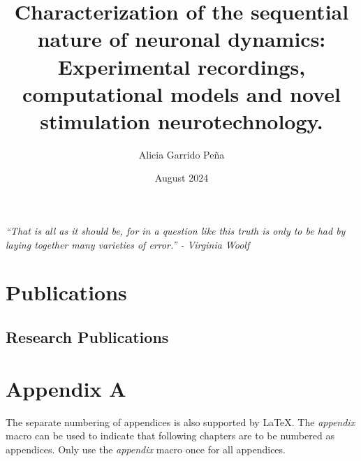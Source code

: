 \documentclass[11pt,a4paper,twoside]{book} %
\title{Characterization of the sequential nature of neuronal dynamics: Experimental recordings, computational models and novel stimulation neurotechnology.}
\author{Alicia Garrido Peña}
\date{August 2024}
\numberwithin{equation}{section}
\begin{document}
\maketitle

% 
% 
% 
\newpage
\clearpage
\newpage


\newpage
\clearpage
\vfill
{\centering \large \textit{``That is all as it should be, for in a question like this truth is only to be had by laying together many
		varieties of error.'' - Virginia Woolf}\par}

\vfill



\tableofcontents
\listoftables
\listoffigures
%

\newpage



\resetpagenumbering










\printbibliography


\begin{appendix}
\chapter{Publications}
 \section{Research Publications}


\begin{refsection}
\nocite{*}

\printbibliography[heading={subbibliography},title={Journal Publications},type=article,resetnumbers=true]

\printbibliography[heading={subbibliography},title={Conference Proceedings},type=inproceedings,resetnumbers=true]


\end{refsection}
\chapter{Appendix A}
The separate numbering of appendices is also supported by LaTeX. The \textit{appendix} macro can be used to indicate that following chapters are to be numbered as appendices. Only use the \textit{appendix} macro once for all appendices.

%
% 


\end{appendix}
\end{document}
